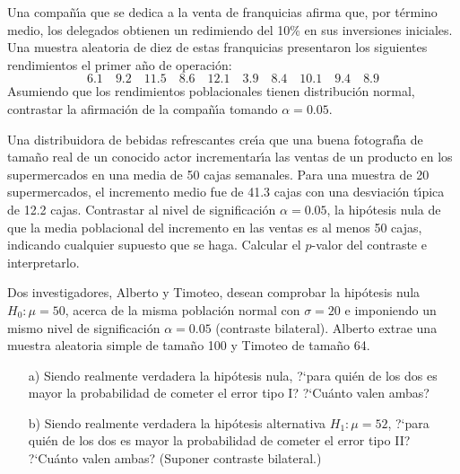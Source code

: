 \begin{prob}%
    Una compa\~n\'{\i}a que se dedica a la venta de franquicias afirma
    que, por t\'{e}rmino medio, los delegados obtienen un redimiendo del
    10\% en sus inversiones iniciales. Una muestra aleatoria de diez de
    estas franquicias presentaron los siguientes rendimientos el primer
    a\~{n}o de operaci\'{o}n:
    $$6.1 \quad 9.2 \quad 11.5 \quad 8.6 \quad 12.1 \quad 3.9 \quad
        8.4 \quad 10.1 \quad 9.4 \quad 8.9$$
    Asumiendo que los rendimientos poblacionales tienen distribuci\'on
    normal, contrastar la afirmaci\'{o}n de la compa\~{n}\'{\i}a tomando
    $\alpha = 0.05$.
\end{prob}

\begin{prob}%
    Una distribuidora de bebidas refrescantes cre\'{\i}a que una buena
    fotograf\'{\i}a de tama\~{n}o real de un conocido actor
    incrementar\'{\i}a las ventas de un producto en los supermercados en una
    media de 50 cajas semanales. Para una muestra de 20 supermercados, el
    incremento medio fue de 41.3 cajas con una desviaci\'{o}n t\'{\i}pica de
    12.2 cajas. Contrastar al nivel de significaci\'{o}n $\alpha = 0.05$, la
    hip\'otesis nula de que la media poblacional del incremento en las ventas
    es al menos 50 cajas, indicando cualquier supuesto que se haga. Calcular
    el $p$-valor del contraste e interpretarlo.
\end{prob}

\begin{prob}%
    Dos investigadores, Alberto y Timoteo, desean comprobar la
    hip\'{o}tesis nula $H_{0}: \mu = 50$, acerca de la misma
    poblaci\'on normal con $\sigma = 20$ e imponiendo un mismo nivel
    de significaci\'on $\alpha = 0.05$ (contraste bilateral). Alberto
    extrae una muestra aleatoria simple de tama\~{n}o 100 y Timoteo
    de tama\~{n}o 64.
    \begin{itemize}
        \item  [a)] Siendo realmente verdadera la hip\'otesis nula,
        ?`para qui\'en de los dos es mayor la probabilidad de cometer
        el error tipo I? ?`Cu\'anto valen ambas?

        \item  [b)] Siendo realmente verdadera la hip\'otesis
        alternativa $H_{1}: \mu = 52$, ?`para qui\'en de los dos es
    mayor la probabilidad de cometer el error tipo II? ?`Cu\'anto
    valen ambas? (Suponer contraste bilateral.)
    \end{itemize}
\end{prob}

